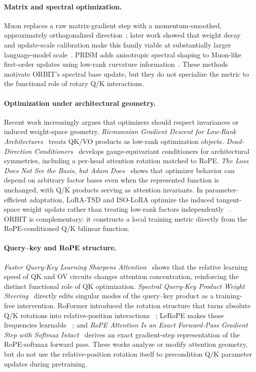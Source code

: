 \documentclass[10pt]{article}
\begin{document}
\paragraph{Matrix and spectral optimization.}
Muon replaces a raw matrix-gradient step with a momentum-smoothed, approximately
orthogonalized direction~\cite{jordan2024muon}; later work showed that weight decay and
update-scale calibration make this family viable at substantially larger language-model
scale~\cite{liu2025muon}. PRISM adds anisotropic spectral shaping to Muon-like first-order
updates using low-rank curvature information~\cite{yang2026prism}. These methods motivate
ORBIT's spectral base update, but they do not specialize the metric to the functional role
of rotary Q/K interactions.

\paragraph{Optimization under architectural geometry.}
Recent work increasingly argues that optimizers should respect invariances or induced
weight-space geometry. \emph{Riemannian Gradient Descent for Low-Rank
Architectures}~\cite{knight2026} treats QK/VO products as low-rank optimization objects.
\emph{Dead-Direction Conditioners}~\cite{shirodkar2026ddc} develops gauge-equivariant
conditioners for architectural symmetries, including a per-head attention rotation matched
to RoPE. \emph{The Loss Does Not See the Basis, but Adam Does}~\cite{singh2026lossbasis}
shows that optimizer behavior can depend on arbitrary factor bases even when the represented
function is unchanged, with Q/K products serving as attention invariants. In
parameter-efficient adaptation, LoRA-TSD and ISO-LoRA optimize the induced tangent-space
weight update rather than treating low-rank factors independently
~\cite{andriianov2026loratsd,zhu2026isolora}. ORBIT is complementary: it constructs a local
training metric directly from the RoPE-conditioned Q/K bilinear function.

\paragraph{Query--key and RoPE structure.}
\emph{Faster Query-Key Learning Sharpens Attention}~\cite{vashisht2026fasterqk} shows
that the relative learning speed of QK and OV circuits changes attention concentration,
reinforcing the distinct functional role of QK optimization. \emph{Spectral Query-Key
Product Weight Steering}~\cite{tiwari2026qksteering} directly edits singular modes of the
query--key product as a training-free intervention. RoFormer introduced the rotation
structure that turns absolute Q/K rotations into relative-position interactions
~\cite{su2021roformer}; LeRoPE makes those frequencies learnable
~\cite{karypis2026lerope}; and \emph{RoPE Attention Is an Exact Forward-Pass Gradient Step
with Softmax Intact}~\cite{huang2026ropegradient} derives an exact gradient-step
representation of the RoPE-softmax forward pass. These works analyze or modify attention
geometry, but do not use the relative-position rotation itself to precondition Q/K
parameter updates during pretraining.
\end{document}
